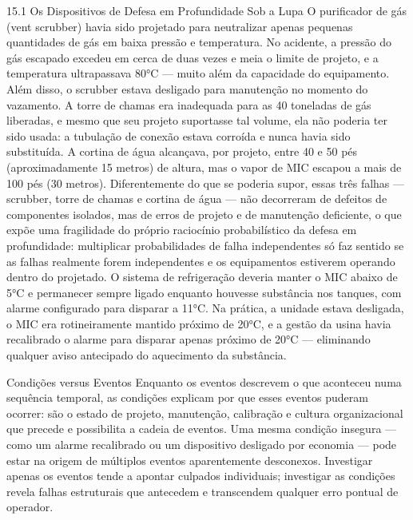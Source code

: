 15.1 Os Dispositivos de Defesa em Profundidade Sob a Lupa O purificador de gás (vent scrubber) havia sido projetado para neutralizar apenas pequenas quantidades de gás em baixa pressão e temperatura. No acidente, a pressão do gás escapado excedeu em cerca de duas vezes e meia o limite de projeto, e a temperatura ultrapassava 80°C — muito além da capacidade do equipamento. Além disso, o scrubber estava desligado para manutenção no momento do vazamento. A torre de chamas era inadequada para as 40 toneladas de gás liberadas, e mesmo que seu projeto suportasse tal volume, ela não poderia ter sido usada: a tubulação de conexão estava corroída e nunca havia sido substituída. A cortina de água alcançava, por projeto, entre 40 e 50 pés (aproximadamente 15 metros) de altura, mas o vapor de MIC escapou a mais de 100 pés (30 metros). Diferentemente do que se poderia supor, essas três falhas — scrubber, torre de chamas e cortina de água — não decorreram de defeitos de componentes isolados, mas de erros de projeto e de manutenção deficiente, o que expõe uma fragilidade do próprio raciocínio probabilístico da defesa em profundidade: multiplicar probabilidades de falha independentes só faz sentido se as falhas realmente forem independentes e os equipamentos estiverem operando dentro do projetado. O sistema de refrigeração deveria manter o MIC abaixo de 5°C e permanecer sempre ligado enquanto houvesse substância nos tanques, com alarme configurado para disparar a 11°C. Na prática, a unidade estava desligada, o MIC era rotineiramente mantido próximo de 20°C, e a gestão da usina havia recalibrado o alarme para disparar apenas próximo de 20°C — eliminando qualquer aviso antecipado do aquecimento da substância.

Condições versus Eventos Enquanto os eventos descrevem o que aconteceu numa sequência temporal, as condições explicam por que esses eventos puderam ocorrer: são o estado de projeto, manutenção, calibração e cultura organizacional que precede e possibilita a cadeia de eventos. Uma mesma condição insegura — como um alarme recalibrado ou um dispositivo desligado por economia — pode estar na origem de múltiplos eventos aparentemente desconexos. Investigar apenas os eventos tende a apontar culpados individuais; investigar as condições revela falhas estruturais que antecedem e transcendem qualquer erro pontual de operador.

